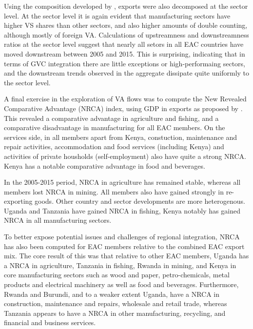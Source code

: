\documentclass[a4paper]{article}
\begin{document}
 Using the composition developed by \citet{wang2013quantifying}, exports were also decomposed at the sector level. At the sector level it is again evident that manufacturing sectors have higher VS shares than other sectors, and also higher amounts of double counting, although mostly of foreign VA. Calculations of upstreamness and downstreamness ratios at the sector level suggest that nearly all setors in all EAC countries have moved downstream between 2005 and 2015. This is surprising, indicating that in terms of GVC integration there are little exceptions or high-performaing sectors, and the downstream trends observed in the aggregate dissipate quite uniformly to the sector level. \newline 

A final exercise in the exploration of VA flows was to compute the New Revealed Comparative Advantage (NRCA) index,  using GDP in exports as proposed by \citet{koopman2014tracing}. This revealed a comparative advantage in agriculture and fishing, and a comparative disadvantage in manufacturing for all EAC members. On the services side, in all members apart from Kenya, constuction, maintenance and repair activities, accommodation and food services (including Kenya) and activities of private housholds (self-employment) also have quite a strong NRCA. Kenya has a notable comparative advantage in food and beverages. \newline

In the 2005-2015 period, NRCA in agriculture has remained stable, whereas all members lost NRCA in mining. All members also have gained strongly in re-exporting goods.  Other country and sector developments are more heterogenous. Uganda and Tanzania have gained NRCA in fishing, Kenya notably has gained NRCA in all manufacturing sectors. \newline

To better expose potential issues and challenges of regional integration, NRCA has also been computed for EAC members relative to the combined EAC export mix. The core result of this was that relative to other EAC members, Uganda has a NRCA in agriculture, Tanzania in fishing, Rwanda in mining, and Kenya in core manufacturing sectors such as wood and paper, petro-chemicals, metal products and electrical machinery as well as food and beverages. Furthermore, Rwanda and Burundi, and to a weaker extent Uganda, have a NRCA in construction, maintenance and repairs, wholesale and retail trade, whereas Tanzania appears to have a NRCA in other manufacturing, recycling, and financial and business services.
\end{document}
